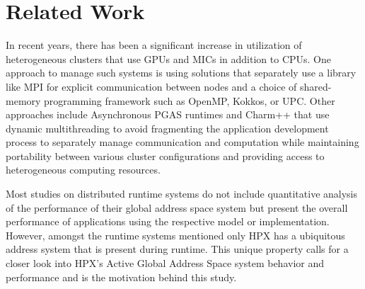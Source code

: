 \section{Related Work}
\label{related_work}

In recent years, there has been a significant increase in utilization of
heterogeneous clusters that use GPUs and MICs in addition to
CPUs\cite{Lena2014,Yang2011266,Potluri2014,Sidelnik2011}. One approach to
manage such systems is using
solutions\cite{Rabenseifner2009,Yang2011266,Chorley2010} that separately use a
library like MPI for explicit communication between nodes and a choice of
shared-memory programming framework such as OpenMP\cite{openmp_org}, Kokkos\cite{kokkos_paper,kokkos_repo}, or
UPC\cite{upc_org}. Other approaches include Asynchronous PGAS
runtimes\cite{Saraswat2010} and Charm++\cite{charm_edu} that use dynamic
multithreading to avoid fragmenting the application development process to
separately manage communication and computation while maintaining portability
between various cluster configurations and providing access to heterogeneous
computing resources\cite{P0234R0}.


Most studies on distributed runtime systems do not include quantitative
analysis of the performance of their global address space system but present
the overall performance of applications using the respective model or
implementation. However, amongst the runtime systems mentioned only HPX has a
ubiquitous address system that is present during runtime. This unique property
calls for a closer look into HPX's Active Global Address Space system behavior
and performance and is the motivation behind this study.
